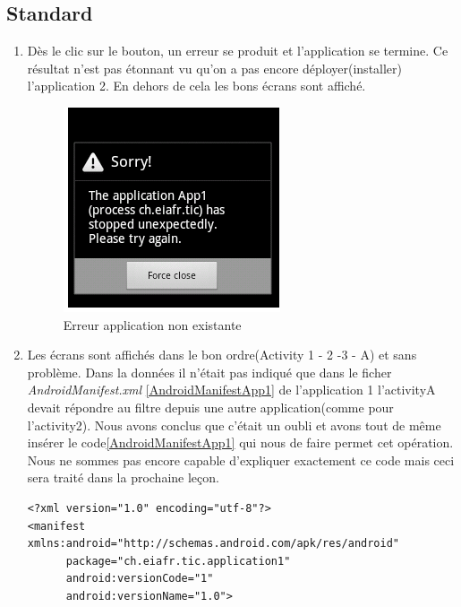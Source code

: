 	\subsection{Standard}
	\begin{enumerate}
	\item Dès le clic sur le bouton, un erreur se produit et l'application se termine. Ce résultat n'est pas étonnant vu qu'on a pas encore déployer(installer) l'application 2. En dehors de cela les bons écrans sont affiché. 
		\begin{figure}[!h]
				\centering
				\includegraphics[scale=0.5]{./images/error2Notexist.png}
				\caption{Erreur application non existante}
		\end{figure}
		\item Les écrans sont affichés dans le bon ordre(Activity 1 - 2 -3 - A) et sans problème.			
			Dans la données il n'était pas indiqué que dans le ficher \textit{AndroidManifest.xml} \ref{AndroidManifestApp1}  de l'application 1 l'activityA devait répondre au filtre depuis une autre application(comme pour l'activity2). Nous avons conclus que c'était un oubli et avons tout de même insérer le code\ref{AndroidManifestApp1}  qui nous de faire permet cet opération. Nous ne sommes pas encore capable d'expliquer exactement ce code mais ceci sera traité dans la prochaine leçon.
			
			\begin{lstlisting}
<?xml version="1.0" encoding="utf-8"?>
<manifest xmlns:android="http://schemas.android.com/apk/res/android"
      package="ch.eiafr.tic.application1"
      android:versionCode="1"
      android:versionName="1.0">
      

\end{lstlisting}
\end{enumerate}
